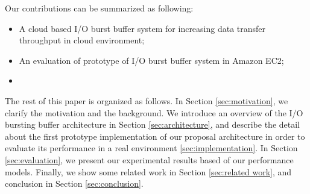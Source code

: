 Our contributions can be summarized as following:
\begin{itemize}
	\item A cloud based I/O burst buffer system for increasing data transfer throughput in cloud environment;
	\item An evaluation of prototype of I/O burst buffer system in Amazon EC2;
    \item {}
\end{itemize}
The rest of this paper is organized as follows. 
In Section \ref{sec:motivation}, we clarify the motivation and the background.
We introduce an overview of the I/O bursting buffer architecture in Section \ref{sec:architecture}, 
and describe the detail about the first prototype implementation of our proposal architecture in order to evaluate its performance in a real environment \ref{sec:implementation}. 
In Section \ref{sec:evaluation}, we present our experimental results based of our performance models. %
Finally, we show some related work in Section \ref{sec:related work}, and conclusion in Section \ref{sec:conclusion}.
